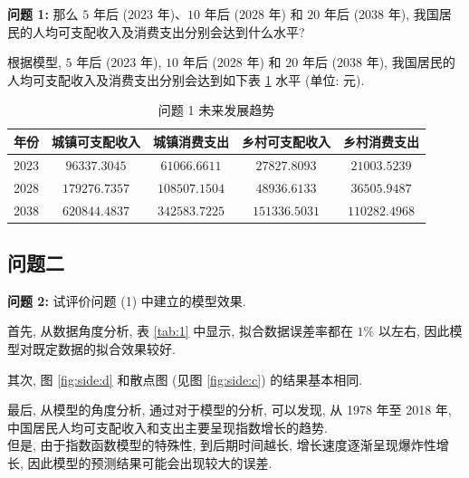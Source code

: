 \documentclass{article}
\begin{document}
\begin{mdframed}
\fangsong
\textbf{问题 1:} 那么 $5$ 年后 ($2023$ 年)、$10$ 年后 ($2028$ 年) 和 $20$ 年后 ($2038$ 年), 我国居民的人均可支配收入及消费支出分别会达到什么水平?
\end{mdframed}

\par 根据模型, $5$ 年后 ($2023$ 年), $10$ 年后 ($2028$ 年) 和 $20$ 年后 ($2038$ 年), 我国居民的人均可支配收入及消费支出分别会达到如下表 \ref{tab:2} 水平 (单位: 元).

\begin{table}[H]
  \centering
  \caption{问题 1 未来发展趋势}
  \label{tab:2}
  \begin{tabular}{ccccc}
    \hline
    \textbf{年份} & \textbf{城镇可支配收入} & \textbf{城镇消费支出} & \textbf{乡村可支配收入} & \textbf{乡村消费支出} \\
    \hline
    2023 & $96337.3045$ & $61066.6611$ & $27827.8093$ & $21003.5239$ \\
    2028 & $179276.7357$ & $108507.1504$ & $48936.6133$ & $36505.9487$ \\
    2038 & $620844.4837$ & $342583.7225$ & $151336.5031$ & $110282.4968$ \\
    \hline
  \end{tabular}
\end{table}

\subsection{问题二}

\begin{mdframed}
\fangsong
\textbf{问题 2:} 试评价问题 (1) 中建立的模型效果.
\end{mdframed}

\par 首先, 从数据角度分析, 表 \ref{tab:1} 中显示, 拟合数据误差率都在 $1\%$ 以左右, 因此模型对既定数据的拟合效果较好.\\
\par 其次, 图 \ref{fig:side:d} 和散点图 (见图 \ref{fig:side:c}) 的结果基本相同.\\
\par 最后, 从模型的角度分析, 通过对于模型的分析, 可以发现, 从 1978 年至 2018 年, 中国居民人均可支配收入和支出主要呈现指数增长的趋势.\\

但是, 由于指数函数模型的特殊性, 到后期时间越长, 增长速度逐渐呈现爆炸性增长, 因此模型的预测结果可能会出现较大的误差.\\
\end{document}
